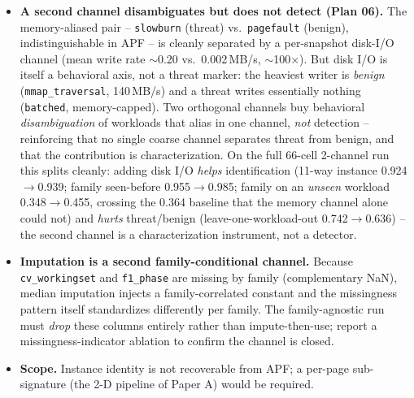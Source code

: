 \documentclass[conference]{IEEEtran}
\begin{document}
\begin{itemize}
        one-class detector trained only on benign flags a held-out threat family
        at ROC-AUC 0.93, because it models ``normal'' and never needs to have seen
        the threat -- the practical split is: known families $\to$ supervised
        classification; novel/unseen family $\to$ anomaly detection.
  \item \textbf{A second channel disambiguates but does not detect (Plan 06).} The
        memory-aliased pair -- \texttt{slowburn} (threat) vs.\ \texttt{pagefault}
        (benign), indistinguishable in APF -- is cleanly separated by a
        per-snapshot disk-I/O channel (mean write rate $\sim$0.20 vs.\
        0.002\,MB/s, $\sim$100$\times$). But disk I/O is itself a behavioral axis,
        not a threat marker: the heaviest writer is \emph{benign}
        (\texttt{mmap\_traversal}, 140\,MB/s) and a threat writes essentially
        nothing (\texttt{batched}, memory-capped). Two orthogonal channels buy
        behavioral \emph{disambiguation} of workloads that alias in one channel,
        \emph{not} detection -- reinforcing that no single coarse channel separates
        threat from benign, and that the contribution is characterization. On the
        full 66-cell 2-channel run this splits cleanly: adding disk I/O \emph{helps}
        identification (11-way instance 0.924$\to$0.939; family seen-before
        0.955$\to$0.985; family on an \emph{unseen} workload 0.348$\to$0.455,
        crossing the 0.364 baseline that the memory channel alone could not) and
        \emph{hurts} threat/benign (leave-one-workload-out 0.742$\to$0.636) -- the
        second channel is a characterization instrument, not a detector.
  \item \textbf{Imputation is a second family-conditional channel.} Because
        \texttt{cv\_workingset} and \texttt{f1\_phase} are missing by family
        (complementary NaN), median imputation injects a family-correlated
        constant and the missingness pattern itself standardizes differently per
        family. The family-agnostic run must \emph{drop} these columns entirely
        rather than impute-then-use; report a missingness-indicator ablation to
        confirm the channel is closed.
  \item \textbf{Scope.} Instance identity is not recoverable from APF; a per-page
        sub-signature (the 2-D pipeline of Paper A) would be required.
\end{itemize}
\end{document}
